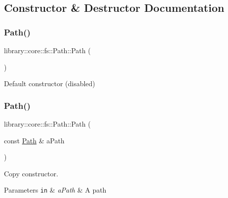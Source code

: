 \subsection{Constructor \& Destructor Documentation}
\mbox{\label{classlibrary_1_1core_1_1fs_1_1_path_aaba9a8e0153813f08f78f1c3275734a4}} 
\subsubsection{\texorpdfstring{Path()}{Path()}\hspace{0.1cm}{\footnotesize\ttfamily [1/2]}}
{\footnotesize\ttfamily library\+::core\+::fs\+::\+Path\+::\+Path (\begin{DoxyParamCaption}{ }\end{DoxyParamCaption})\hspace{0.3cm}{\ttfamily [delete]}}



Default constructor (disabled) 

\mbox{\label{classlibrary_1_1core_1_1fs_1_1_path_aabc4240fc08479d1bff6b9753f2b5cc2}} 
\subsubsection{\texorpdfstring{Path()}{Path()}\hspace{0.1cm}{\footnotesize\ttfamily [2/2]}}
{\footnotesize\ttfamily library\+::core\+::fs\+::\+Path\+::\+Path (\begin{DoxyParamCaption}\item[{const \hyperlink{classlibrary_1_1core_1_1fs_1_1_path}{Path} \&}]{a\+Path }\end{DoxyParamCaption})}



Copy constructor. 


\begin{DoxyParams}[1]{Parameters}
\mbox{\tt in}  & {\em a\+Path} & A path \\
\hline
\end{DoxyParams}


